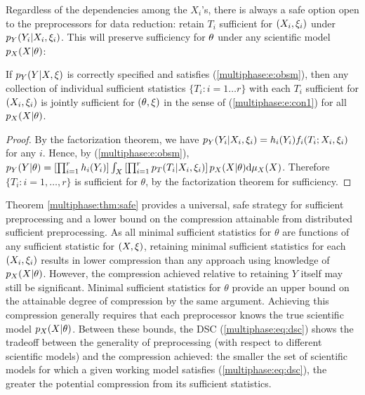 Regardless of the dependencies among the $X_i$'s, there is always a safe option open to the preprocessors for data reduction: retain $T_i$ sufficient for $(X_i, \xi_i)$ under $p_Y(Y_i | X_i, \xi_i)$.
This will preserve sufficiency for $\theta$ under any scientific model $p_X(X | \theta)$:
%
\begin{theorem}\label{multiphase:thm:safe}
If $p_Y(Y | X, \xi)$ is correctly specified and satisfies (\ref{multiphase:e:obsm}), then any collection of individual sufficient statistics $\{T_i : i=1 \ldots r\}$ with each $T_i$ sufficient for $(X_i, \xi_i)$ is jointly sufficient for $(\theta, \xi)$ in the sense of (\ref{multiphase:e:con1}) for all $p_X(X | \theta)$.
\end{theorem}
\begin{proof}
By the factorization theorem, we have $p_Y(Y_i | X_i, \xi_i) = h_i(Y_i) f_i(T_i ; X_i, \xi_i)$ for any $i$. Hence, by (\ref{multiphase:e:obsm}), $ p_Y(Y | \theta) = \left[ \prod_{i=1}^r h_i(Y_i) \right] \int_X \left[ \prod_{i=1}^r p_T(T_i | X_i, \xi_i) \right] p_X(X | \theta) \mathrm{d}\mu_X( X)$.  Therefore $\{T_i : i=1 ,\ldots ,r\}$ is sufficient for $\theta$, by the factorization theorem for sufficiency. 
\end{proof}
%
Theorem \ref{multiphase:thm:safe} provides a universal, safe strategy for sufficient preprocessing and a lower bound on the compression attainable from distributed sufficient preprocessing.
As all minimal sufficient statistics for $\theta$ are functions of any sufficient statistic for $(X, \xi)$, retaining minimal sufficient statistics for each $(X_i, \xi_i)$ results in lower compression than any approach using knowledge of $p_X(X | \theta)$.
However, the compression achieved relative to retaining $Y$ itself may still be significant.
%
Minimal sufficient statistics for $\theta$ provide an upper bound on the attainable degree of compression by the same argument.
Achieving this compression generally requires that each preprocessor knows the true scientific model $p_X(X | \theta)$.
Between these bounds, the DSC (\ref{multiphase:eq:dsc}) shows the tradeoff between the generality of preprocessing (with respect to different scientific models) and the compression achieved: the smaller the set of scientific models for which a given working model satisfies (\ref{multiphase:eq:dsc}), the greater the potential compression from its sufficient statistics.

